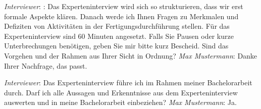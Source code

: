 \textit{Interviewer}: : Das Experteninterview wird sich so strukturieren, dass wir erst formale Aspekte klären. Danach werde ich Ihnen Fragen zu Merkmalen und Defiziten von Aktivitäten in der Fertigungsdurchführung stellen. Für das Experteninterview sind 60 Minuten angesetzt. Falls Sie Pausen oder kurze Unterbrechungen benötigen, geben Sie mir bitte kurz Bescheid. Sind das Vorgehen und der Rahmen aus Ihrer Sicht in Ordnung?
\newline
\textit{Max Mustermann}: Danke Ihrer Nachfrage, das passt.

\textit{Interviewer}: Das Experteninterview führe ich im Rahmen meiner Bachelorarbeit durch. Darf ich alle Aussagen und Erkenntnisse aus dem Experteninterview auswerten und in meine Bachelorarbeit einbeziehen?
\newline
\textit{Max Mustermann}: Ja.




